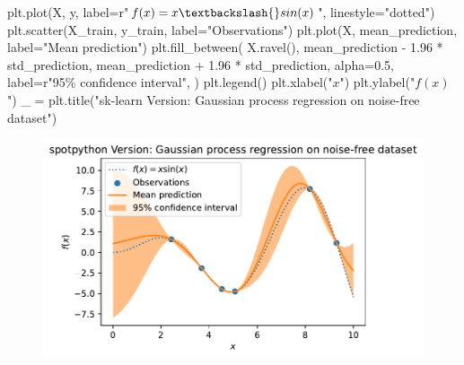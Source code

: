 \documentclass[
  letterpaper,
  DIV=11,
  numbers=noendperiod]{scrreprt}
\newenvironment{Shaded}{\begin{snugshade}}{\end{snugshade}}
\newcommand{\FloatTok}[1]{\textcolor[rgb]{0.68,0.00,0.00}{#1}}
\newcommand{\NormalTok}[1]{\textcolor[rgb]{0.00,0.23,0.31}{#1}}
\newcommand{\OperatorTok}[1]{\textcolor[rgb]{0.37,0.37,0.37}{#1}}
\newcommand{\SpecialCharTok}[1]{\textcolor[rgb]{0.37,0.37,0.37}{#1}}
\newcommand{\StringTok}[1]{\textcolor[rgb]{0.13,0.47,0.30}{#1}}
\newcommand{\VerbatimStringTok}[1]{\textcolor[rgb]{0.13,0.47,0.30}{#1}}
\begin{document}
\begin{Shaded}
\begin{Highlighting}[]
\NormalTok{plt.plot(X, y, label}\OperatorTok{=}\VerbatimStringTok{r"$f(x) = x \textbackslash{}sin(x)$"}\NormalTok{, linestyle}\OperatorTok{=}\StringTok{"dotted"}\NormalTok{)}
\NormalTok{plt.scatter(X\_train, y\_train, label}\OperatorTok{=}\StringTok{"Observations"}\NormalTok{)}
\NormalTok{plt.plot(X, mean\_prediction, label}\OperatorTok{=}\StringTok{"Mean prediction"}\NormalTok{)}
\NormalTok{plt.fill\_between(}
\NormalTok{    X.ravel(),}
\NormalTok{    mean\_prediction }\OperatorTok{{-}} \FloatTok{1.96} \OperatorTok{*}\NormalTok{ std\_prediction,}
\NormalTok{    mean\_prediction }\OperatorTok{+} \FloatTok{1.96} \OperatorTok{*}\NormalTok{ std\_prediction,}
\NormalTok{    alpha}\OperatorTok{=}\FloatTok{0.5}\NormalTok{,}
\NormalTok{    label}\OperatorTok{=}\VerbatimStringTok{r"95}\SpecialCharTok{\% c}\VerbatimStringTok{onfidence interval"}\NormalTok{,}
\NormalTok{)}
\NormalTok{plt.legend()}
\NormalTok{plt.xlabel(}\StringTok{"$x$"}\NormalTok{)}
\NormalTok{plt.ylabel(}\StringTok{"$f(x)$"}\NormalTok{)}
\NormalTok{\_ }\OperatorTok{=}\NormalTok{ plt.title(}\StringTok{"sk{-}learn Version: Gaussian process regression on noise{-}free dataset"}\NormalTok{)}
\end{Highlighting}
\end{Shaded}

\begin{figure}[H]

{\centering \includegraphics{012_num_spot_ei_files/figure-pdf/cell-25-output-1.pdf}

}

\end{figure}
\end{document}
